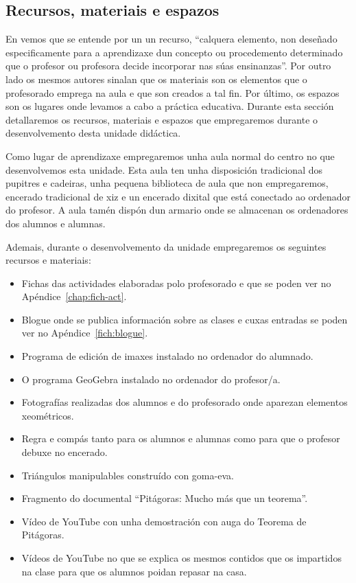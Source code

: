 \subsection{Recursos, materiais e espazos}\label{sec:recursos}

En  vemos que se entende por un un recurso, ``calquera elemento, non deseñado especificamente para a aprendizaxe dun concepto ou procedemento determinado que o profesor ou profesora decide incorporar nas súas ensinanzas''. Por outro lado os mesmos autores sinalan que os materiais son os elementos que o profesorado emprega na aula e que son creados a tal fin. Por último, os espazos son os lugares onde levamos a cabo a práctica educativa. Durante esta sección detallaremos os recursos, materiais e espazos que empregaremos durante o desenvolvemento desta unidade didáctica.

Como lugar de aprendizaxe empregaremos unha aula normal do centro no que desenvolvemos esta unidade. Esta aula ten unha disposición tradicional dos pupitres e cadeiras, unha pequena biblioteca de aula que non empregaremos, encerado tradicional de xiz e un encerado dixital que está conectado ao ordenador do profesor. A aula tamén dispón dun armario onde se almacenan os ordenadores dos alumnos e alumnas.

Ademais, durante o desenvolvemento da unidade empregaremos os seguintes recursos e materiais:

\begin{itemize}
    \item Fichas das actividades elaboradas polo profesorado e que se poden ver no Apéndice~\ref{chap:fich-act}.
    \item Blogue onde se publica información sobre as clases e cuxas entradas se poden ver no Apéndice~\ref{fich:blogue}.
    \item Programa de edición de imaxes instalado no ordenador do alumnado.
    \item O programa GeoGebra instalado no ordenador do profesor/a.
    \item Fotografías realizadas dos alumnos e do profesorado onde aparezan elementos xeométricos.
    \item Regra e compás tanto para os alumnos e alumnas como para que o profesor debuxe no encerado.
    \item Triángulos manipulables construído con goma-eva.
    \item Fragmento do documental ``Pitágoras: Mucho más que un teorema''.
    \item Vídeo de YouTube con unha demostración con auga do Teorema de Pitágoras.
    \item Vídeos de YouTube no que se explica os mesmos contidos que os impartidos na clase para que os alumnos poidan repasar na casa.
\end{itemize}
